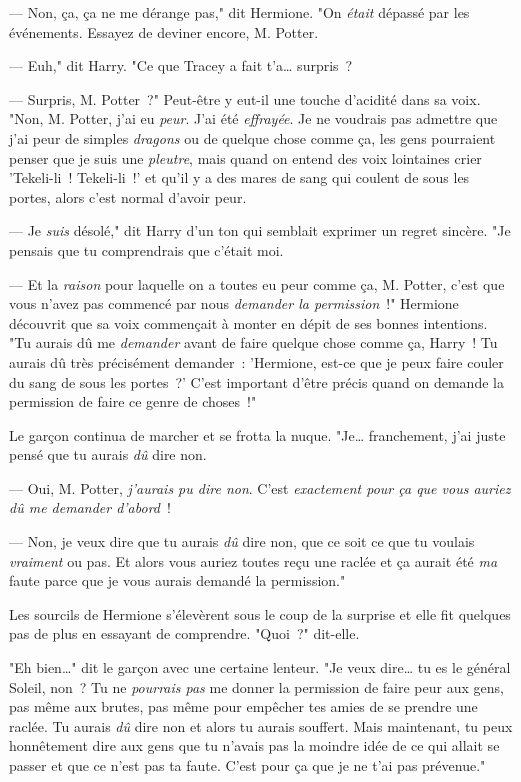 --- Non, ça, ça ne me dérange pas," dit Hermione. "On \emph{était} dépassé par les événements. Essayez de deviner encore, M. Potter.

--- Euh," dit Harry. "Ce que Tracey a fait t'a… surpris~?

--- Surpris, M. Potter~?" Peut-être y eut-il une touche d'acidité dans sa voix. "Non, M. Potter, j'ai eu \emph{peur}. J'ai été \emph{effrayée}. Je ne voudrais pas admettre que j'ai peur de simples \emph{dragons} ou de quelque chose comme ça, les gens pourraient penser que je suis une \emph{pleutre}, mais quand on entend des voix lointaines crier 'Tekeli-li~! Tekeli-li~!' et qu'il y a des mares de sang qui coulent de sous les portes, alors c'est normal d'avoir peur.

--- Je \emph{suis} désolé," dit Harry d'un ton qui semblait exprimer un regret sincère. "Je pensais que tu comprendrais que c'était moi.

--- Et la \emph{raison} pour laquelle on a toutes eu peur comme ça, M. Potter, c'est que vous n'avez pas commencé par nous \emph{demander la permission}~!" Hermione découvrit que sa voix commençait à monter en dépit de ses bonnes intentions. "Tu aurais dû me \emph{demander} avant de faire quelque chose comme ça, Harry~! Tu aurais dû très précisément demander~: 'Hermione, est-ce que je peux faire couler du sang de sous les portes~?' C'est important d'être précis quand on demande la permission de faire ce genre de choses~!"

Le garçon continua de marcher et se frotta la nuque. "Je… franchement, j'ai juste pensé que tu aurais \emph{dû} dire non.

--- Oui, M. Potter, \emph{j'aurais pu dire non}. C'est \emph{exactement pour ça que vous auriez dû me demander d'abord}~!

--- Non, je veux dire que tu aurais \emph{dû} dire non, que ce soit ce que tu voulais \emph{vraiment} ou pas. Et alors vous auriez toutes reçu une raclée et ça aurait été \emph{ma} faute parce que je vous aurais demandé la permission."

Les sourcils de Hermione s'élevèrent sous le coup de la surprise et elle fit quelques pas de plus en essayant de comprendre. "Quoi~?" dit-elle.

"Eh bien…" dit le garçon avec une certaine lenteur. "Je veux dire… tu es le général Soleil, non~? Tu ne \emph{pourrais pas} me donner la permission de faire peur aux gens, pas même aux brutes, pas même pour empêcher tes amies de se prendre une raclée. Tu aurais \emph{dû} dire non et alors tu aurais souffert. Mais maintenant, tu peux honnêtement dire aux gens que tu n'avais pas la moindre idée de ce qui allait se passer et que ce n'est pas ta faute. C'est pour ça que je ne t'ai pas prévenue."

